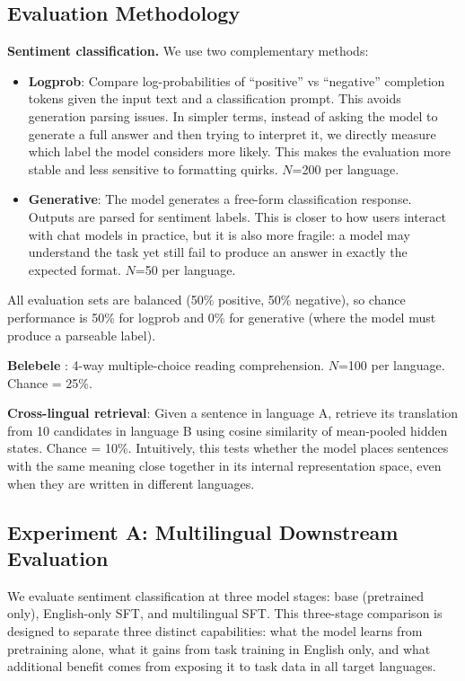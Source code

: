 \documentclass[10pt,twocolumn]{article}
\begin{document}
\subsection{Evaluation Methodology}

\textbf{Sentiment classification.} We use two complementary methods:
\begin{itemize}
    \item \textbf{Logprob}: Compare log-probabilities of ``positive'' vs ``negative'' completion tokens given the input text and a classification prompt. This avoids generation parsing issues. In simpler terms, instead of asking the model to generate a full answer and then trying to interpret it, we directly measure which label the model considers more likely. This makes the evaluation more stable and less sensitive to formatting quirks. $N$=200 per language.
    \item \textbf{Generative}: The model generates a free-form classification response. Outputs are parsed for sentiment labels. This is closer to how users interact with chat models in practice, but it is also more fragile: a model may understand the task yet still fail to produce an answer in exactly the expected format. $N$=50 per language.
\end{itemize}

All evaluation sets are balanced (50\% positive, 50\% negative), so chance performance is 50\% for logprob and 0\% for generative (where the model must produce a parseable label).

\textbf{Belebele} \citep{bandarkar2023belebele}: 4-way multiple-choice reading comprehension. $N$=100 per language. Chance = 25\%.

\textbf{Cross-lingual retrieval}: Given a sentence in language A, retrieve its translation from 10 candidates in language B using cosine similarity of mean-pooled hidden states. Chance = 10\%. Intuitively, this tests whether the model places sentences with the same meaning close together in its internal representation space, even when they are written in different languages.

\subsection{Experiment A: Multilingual Downstream Evaluation}
\label{sec:exp_a}

We evaluate sentiment classification at three model stages: base (pretrained only), English-only SFT, and multilingual SFT. This three-stage comparison is designed to separate three distinct capabilities: what the model learns from pretraining alone, what it gains from task training in English only, and what additional benefit comes from exposing it to task data in all target languages.
\end{document}

